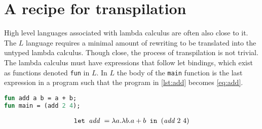 \section{A recipe for transpilation}
High level languages associated with lambda calculus are often also close to it.
The $L$ language requires a minimal amount of rewriting to be translated into the untyped lambda calculus.
Though close, the process of transpilation is not trivial.
The lambda calculus must have expressions that follow let bindings, which exist as functions denoted \texttt{fun} in $L$.
In $L$ the body of the \texttt{main} function is the last expression in a program such that the program in \autoref{lst:add} becomes \autoref{eq:add}.
\begin{lstlisting}[language=ML,caption={Add function in L},label={lst:add}]
fun add a b = a + b;
fun main = (add 2 4);
\end{lstlisting}
\begin{align}
  \texttt{let } \textit{add } = \lambda a.\lambda b.a + b \texttt{ in } (\textit{add } 2 \,\, 4)\label{eq:add}
\end{align}

